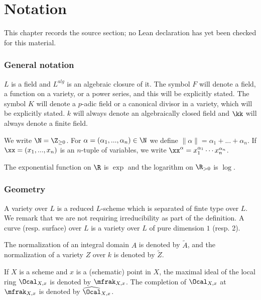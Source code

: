 \chapter{Notation}
\label{chabauty-coleman-bound-surfaces-chapter-02}

\begin{remark}
\label{chabauty-coleman-bound-surfaces-chapter-02-source}
This chapter records the source section; no Lean declaration has yet been checked for this material.
\notready
\end{remark}

\subsection{General notation}\label{NotationFields} $L$ is a field and $L^{alg}$ is an algebraic closure of it. The symbol $F$ will denote a field, a function on a variety, or a power series, and this will be explicitly stated.  The symbol $K$ will denote a $p$-adic field or a canonical divisor in a variety, which will be explicitly stated.  $k$ will always denote an algebraically closed field and $\kk$ will always denote a finite field.


We write $\N=\Z_{\ge 0}$. For $\alpha=(\alpha_1,...,\alpha_n)\in \N$ we define $\|\alpha\|=\alpha_1+...+\alpha_n$. If $\xx=(x_1,...,x_n)$ is an $n$-tuple of variables, we write $\xx^{\alpha}=x_1^{\alpha_1}\cdots x_n^{\alpha_n}$.


The exponential function on $\R$ is $\exp$ and the logarithm on $\R_{>0}$ is $\log$.
\subsection{Geometry}\label{notationGeo} A variety over $L$ is a reduced $L$-scheme which is separated of finte type over $L$. We remark that we are not requiring irreducibility as part of the definition. A curve (resp. surface) over $L$ is a variety over $L$ of pure dimension $1$ (resp. 2).

The normalization of an integral domain $A$ is denoted by $\widetilde{A}$, and the normalization of a variety $Z$ over $k$ is denoted by $\widetilde{Z}$.

If $X$ is a scheme and $x$ is a (schematic) point in $X$, the maximal ideal of the local ring $\Ocal_{X,x}$ is denoted by $\mfrak_{X,x}$. The completion of $\Ocal_{X,x}$ at $\mfrak_{X,x}$ is denoted by $\widehat{\Ocal}_{X,x}$.

